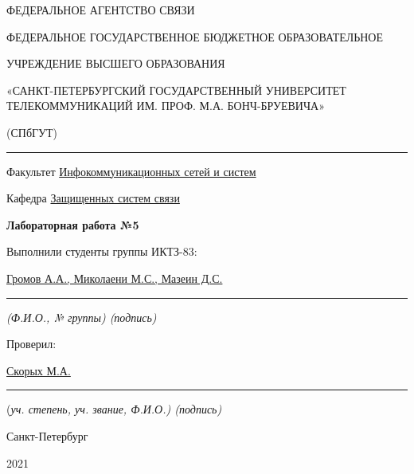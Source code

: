\documentclass[a4paper,14pt]{extarticle}
\begin{document}
    \begin{center}
        \thispagestyle{empty}
        \begin{singlespace}
        ФЕДЕРАЛЬНОЕ АГЕНТСТВО СВЯЗИ

        ФЕДЕРАЛЬНОЕ ГОСУДАРСТВЕННОЕ БЮДЖЕТНОЕ ОБРАЗОВАТЕЛЬНОЕ

        УЧРЕЖДЕНИЕ ВЫСШЕГО ОБРАЗОВАНИЯ

        «САНКТ-ПЕТЕРБУРГСКИЙ ГОСУДАРСТВЕННЫЙ УНИВЕРСИТЕТ ТЕЛЕКОММУНИКАЦИЙ ИМ. ПРОФ. М.А. БОНЧ-БРУЕВИЧА»

        (СПбГУТ)
        \end{singlespace}
        \vspace{-1ex}
        \rule{\textwidth}{0.4pt}
        \vspace{-5ex}

        Факультет \underline{Инфокоммуникационных сетей и систем}

        Кафедра \underline{Защищенных систем связи}
        \vspace{10ex}

        \textbf{Лабораторная работа №5}\\
        


    \end{center}
    \vspace{4ex}
    \begin{flushright}
    \parbox{10 cm}{
    \begin{flushleft}
        Выполнили студенты группы ИКТЗ-83:

        \underline{Громов А.А., Миколаени М.С., Мазеин Д.С.} \hfill \rule[-0.85ex]{0.1\textwidth}{0.6pt}

        \footnotesize \textit{ (Ф.И.О., № группы) \hfill (подпись)} \normalsize

        Проверил:

        \underline{Скорых М.А.} \hfill \rule[-0.85ex]{0.1\textwidth}{0.6pt}

        (\footnotesize \textit{уч. степень, уч. звание, Ф.И.О.) \hfill (подпись)} \normalsize

    \end{flushleft}
    }
    \end{flushright}
    \begin{center}
        \vfill
        Санкт-Петербург

        2021

    \end{center}
    \newpage
\end{document}
